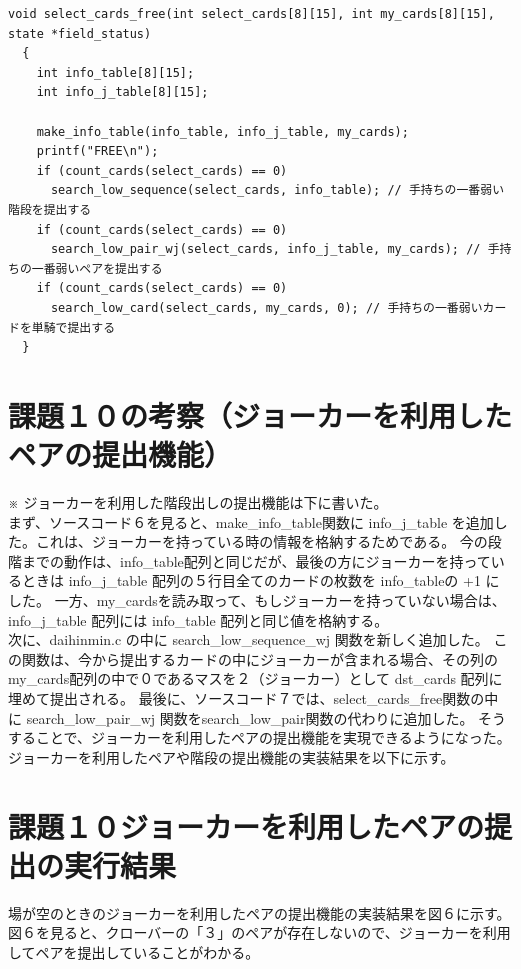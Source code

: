 \documentclass[]{jsarticle}
\begin{document}
\begin{lstlisting}[caption={select\_cards.c}]
  void select_cards_free(int select_cards[8][15], int my_cards[8][15], state *field_status)
  {
    int info_table[8][15];
    int info_j_table[8][15];
  
    make_info_table(info_table, info_j_table, my_cards);
    printf("FREE\n");
    if (count_cards(select_cards) == 0)
      search_low_sequence(select_cards, info_table); // 手持ちの一番弱い階段を提出する
    if (count_cards(select_cards) == 0)
      search_low_pair_wj(select_cards, info_j_table, my_cards); // 手持ちの一番弱いペアを提出する
    if (count_cards(select_cards) == 0)
      search_low_card(select_cards, my_cards, 0); // 手持ちの一番弱いカードを単騎で提出する
  }
\end{lstlisting}
\section*{課題１０の考察（ジョーカーを利用したペアの提出機能）}
\noindent ※ ジョーカーを利用した階段出しの提出機能は下に書いた。\\

まず、ソースコード６を見ると、make\_info\_table関数に info\_j\_table を追加した。これは、ジョーカーを持っている時の情報を格納するためである。
今の段階までの動作は、info\_table配列と同じだが、最後の方にジョーカーを持っているときは info\_j\_table 配列の５行目全てのカードの枚数を info\_tableの +1 にした。
一方、my\_cardsを読み取って、もしジョーカーを持っていない場合は、info\_j\_table 配列には info\_table 配列と同じ値を格納する。\\

次に、daihinmin.c の中に search\_low\_sequence\_wj 関数を新しく追加した。
この関数は、今から提出するカードの中にジョーカーが含まれる場合、その列のmy\_cards配列の中で０であるマスを２（ジョーカー）として dst\_cards 配列に埋めて提出される。
最後に、ソースコード７では、select\_cards\_free関数の中に search\_low\_pair\_wj 関数をsearch\_low\_pair関数の代わりに追加した。
そうすることで、ジョーカーを利用したペアの提出機能を実現できるようになった。\\

\noindent ジョーカーを利用したペアや階段の提出機能の実装結果を以下に示す。\\

\newpage

\section*{課題１０ジョーカーを利用したペアの提出の実行結果}
場が空のときのジョーカーを利用したペアの提出機能の実装結果を図６に示す。図６を見ると、クローバーの「３」のペアが存在しないので、ジョーカーを利用してペアを提出していることがわかる。\\
\end{document}

